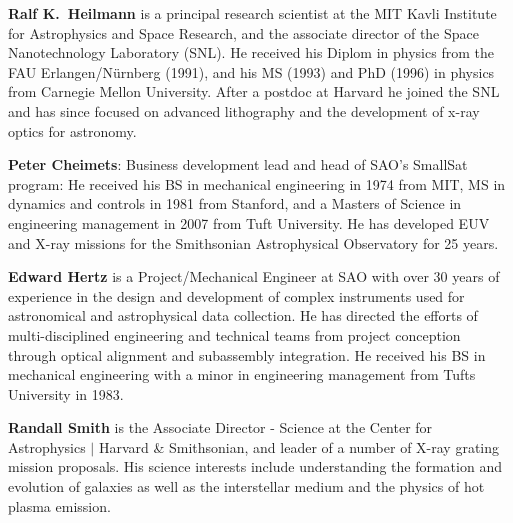 \documentclass[12pt]{spieman}  %
\begin{document}
\begin{spacing}{1}
\vspace{1ex}
\vspace{2ex}\noindent\textbf{Ralf K.~Heilmann} is a principal research scientist at the MIT Kavli Institute for Astrophysics and Space Research, and the associate director of the Space Nanotechnology Laboratory (SNL).  He received his Diplom in physics from the FAU Erlangen/N\"urnberg (1991), and his MS (1993) and PhD (1996) in physics from Carnegie Mellon University.  After a postdoc at Harvard he joined the SNL and has since focused on advanced lithography and the development of x-ray optics for astronomy.


\vspace{1ex}
\vspace{2ex}\noindent\textbf{Peter Cheimets}: Business development lead and head of SAO's SmallSat program: He received his BS in mechanical engineering in 1974 from MIT, MS in dynamics and controls in 1981 from Stanford, and a Masters of Science in engineering management in 2007 from Tuft University. He has developed EUV and X-ray missions for the Smithsonian Astrophysical Observatory for 25 years.

\vspace{1ex}
\vspace{2ex}\noindent\textbf{Edward Hertz} is a Project/Mechanical Engineer at SAO with over 30 years of experience in the design and development of complex instruments used for astronomical and astrophysical data collection.  He has directed the efforts of multi-disciplined engineering and technical teams from project conception through optical alignment and subassembly integration.  He received his BS in mechanical engineering with a minor in engineering management from Tufts University in 1983.


\vspace{1ex}
\vspace{2ex}\noindent\textbf{Randall Smith} is the Associate Director - Science at the Center for Astrophysics $|$ Harvard \& Smithsonian, and leader of a number of X-ray grating mission proposals. His science interests include understanding the formation and evolution of galaxies as well as the interstellar medium and the physics of hot plasma emission.







\listoffigures
\listoftables

\end{spacing}
\end{document}

